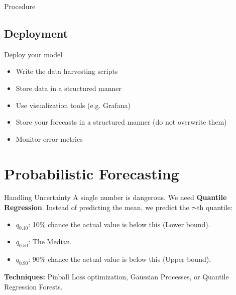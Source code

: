 \begin{frame}{Procedure}    
\end{frame}
\subsection{Deployment}
\begin{frame}{Deploy your model}
    \begin{itemize}
        \item Write the data harvesting scripts
        \item Store data in a structured manner
        \item Use visualization tools (e.g. Grafana)
        \item Store your forecasts in a structured manner (do not overwrite them)
        \item Monitor error metrics
    \end{itemize}
\end{frame} 

\section{Probabilistic Forecasting}
\begin{frame}{Handling Uncertainty}
    A single number is dangerous. We need \textbf{Quantile Regression}.
    \vspace{0.3cm}
    Instead of predicting the mean, we predict the $\tau$-th quantile:
    \begin{itemize}
        \item $q_{0.10}$: 10\% chance the actual value is below this (Lower bound).
        \item $q_{0.50}$: The Median.
        \item $q_{0.90}$: 90\% chance the actual value is below this (Upper bound).
    \end{itemize}
    \vspace{0.3cm}
    \textbf{Techniques:} Pinball Loss optimization, Gaussian Processes, or Quantile Regression Forests.
\end{frame}

